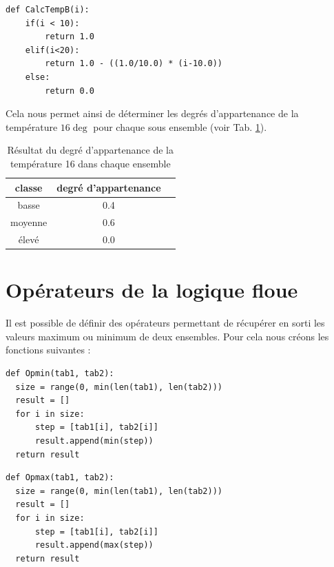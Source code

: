 \documentclass[a4paper,11pt]{article}
\begin{document}
\begin{lstlisting}[caption=Fonction de l'ensemble température basse]
  def CalcTempB(i):
    if(i < 10):
        return 1.0
    elif(i<20):
        return 1.0 - ((1.0/10.0) * (i-10.0))
    else:
        return 0.0
\end{lstlisting}

Cela nous permet ainsi de déterminer les degrés d'appartenance de la température $16\deg$ pour chaque sous 
ensemble (voir Tab. \ref{tab:temp16}).
\begin{table}[!h]
  \label{tab:temp16}
  \begin{center}
    \begin{tabular}{|c|c|c|}
      \hline
       classe & degré d'appartenance\\
       \hline
       basse & 0.4\\
       moyenne & 0.6\\
       élevé & 0.0\\
    \end{tabular}
    \caption{Résultat du degré d'appartenance de la température 16 dans chaque ensemble}
  \end{center}
\end{table}

\section{Opérateurs de la logique floue}
Il est possible de définir des opérateurs permettant de récupérer en sorti les valeurs maximum ou 
minimum de deux ensembles. Pour cela nous créons les fonctions suivantes :
\begin{lstlisting}[caption=Opérateur min]
 def Opmin(tab1, tab2):
  size = range(0, min(len(tab1), len(tab2)))
  result = []
  for i in size:
      step = [tab1[i], tab2[i]]
      result.append(min(step))
  return result
\end{lstlisting}

\begin{lstlisting}[caption=Opérateur max]
 def Opmax(tab1, tab2):
  size = range(0, min(len(tab1), len(tab2)))
  result = []
  for i in size:
      step = [tab1[i], tab2[i]]
      result.append(max(step))
  return result
\end{lstlisting}
\end{document}
